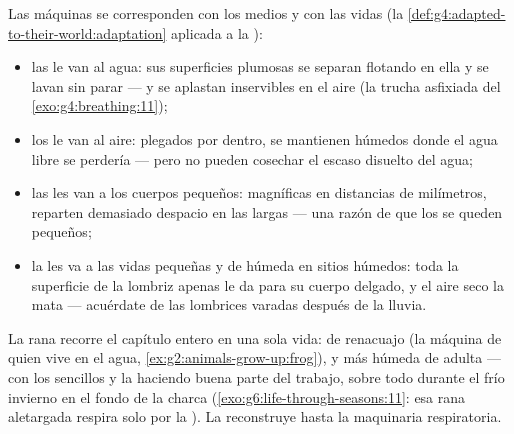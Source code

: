 \begin{proposition}\label{prop:g7:how-animals-breathe:fits}
Las máquinas se corresponden con los medios y con las vidas (la
\cref{def:g4:adapted-to-their-world:adaptation} aplicada a la
):
\begin{itemize}
  \item las  le van al agua: sus superficies plumosas se
        separan flotando en ella y se lavan sin parar --- y se aplastan
        inservibles en el aire (la trucha asfixiada del
        \cref{exo:g4:breathing:11});
  \item los  le van al aire: plegados por dentro, se mantienen
        húmedos donde el agua libre se perdería --- pero no pueden
        cosechar el escaso  disuelto del agua;
  \item las  les van a los cuerpos pequeños: magníficas en
        distancias de milímetros, reparten demasiado despacio en las
        largas --- una razón de que los  se queden pequeños;
  \item la  les va a las vidas pequeñas y de 
        húmeda en sitios húmedos: toda la superficie de la lombriz
        apenas le da para su cuerpo delgado, y el aire seco la mata ---
        acuérdate de las lombrices varadas después de la lluvia.
\end{itemize}
\end{proposition}
\admitted

\begin{example}\label{ex:g7:how-animals-breathe:frog}
La rana recorre el capítulo entero en una sola vida:  de
renacuajo (la máquina de quien vive en el agua,
\cref{ex:g2:animals-grow-up:frog}), y  más  húmeda de
adulta --- con los  sencillos y la  haciendo buena parte
del trabajo, sobre todo durante el frío invierno en el fondo de la
charca (\cref{exo:g6:life-through-seasons:11}: esa rana aletargada
respira solo por la ). La  reconstruye hasta la
maquinaria respiratoria.
\end{example}

